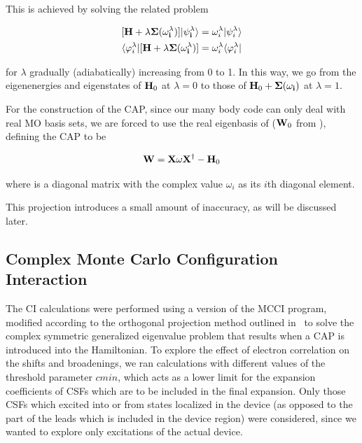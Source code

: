 This is achieved by solving the related problem

\begin{subequations}
\begin{align}
	[\mathbf{H} + \lambda \mathbf{\Sigma(\omega_i^\lambda)] |\psi_i^\lambda \rangle}
	&= \omega_i^\lambda |\psi_i^\lambda \rangle \\
	\langle \varphi_i^\lambda| [\mathbf{H} + \lambda \mathbf{\Sigma(\omega_i^\lambda)}]
	&= \omega_i^\lambda \langle \varphi_i^\lambda| 
	\label{eq:adiabaticap}
\end{align}
\end{subequations}

for $\lambda$ gradually (adiabatically) increasing from 0 to 1. In this way, we
go from the eigenenergies and eigenstates of $\mathbf{H}_0$ at $\lambda = 0$ to
those of $\mathbf{H}_0 + \mathbf{\Sigma(\omega_i)}$ at $\lambda = 1$.

For the construction of the \ac{CAP}, since our many body code can only deal
with real MO basis sets, we are forced to use the real eigenbasis of 
($\mathbf{W}_0$ from \cite{henderson}), defining the \ac{CAP} to be

\begin{equation}
	\mathbf{W} = \mathbf{X}\mathbf{\omega}\mathbf{X}^\dagger - \mathbf{H}_0
	\label{eq:capsdef}
\end{equation}

where \umm{\omega} is a diagonal matrix with the complex value $\omega_i$ as
its $i$th diagonal element.

This projection introduces a small amount of inaccuracy, as will be discussed
later.

\subsection{Complex Monte Carlo Configuration Interaction}

The \ac{CI} calculations were performed using a version of the \ac{MCCI}
program, modified according to the orthogonal projection method outlined
in~\cite{tarantelli_csd} to solve the complex symmetric generalized eigenvalue
problem that results when a \ac{CAP} is introduced into the Hamiltonian. To
explore the effect of electron correlation on the shifts and broadenings, we
ran calculations with different values of the threshold parameter $cmin$, which
acts as a lower limit for the expansion coefficients of \acp{CSF} which are to
be included in the final expansion. Only those \acp{CSF} which excited into or
from states localized in the device (as opposed to the part of the leads which
is included in the device region) were considered, since we wanted to explore
only excitations of the actual device.

